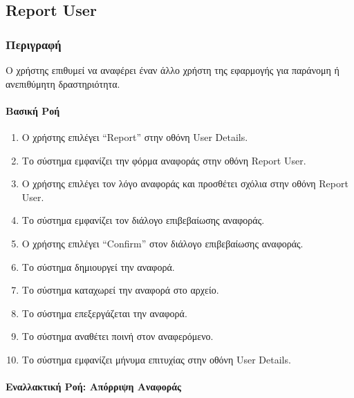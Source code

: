 \hypertarget{report-user}{%
\subsection{Report User}\label{report-user}}

\hypertarget{ux3c0ux3b5ux3c1ux3b9ux3b3ux3c1ux3b1ux3c6ux3ae}{%
\subsubsection{Περιγραφή}\label{ux3c0ux3b5ux3c1ux3b9ux3b3ux3c1ux3b1ux3c6ux3ae}}

Ο χρήστης επιθυμεί να αναφέρει έναν άλλο χρήστη της εφαρμογής για
παράνομη ή ανεπιθύμητη δραστηριότητα.

\hypertarget{ux3b2ux3b1ux3c3ux3b9ux3baux3ae-ux3c1ux3bfux3ae}{%
\paragraph{Βασική
Ροή}\label{ux3b2ux3b1ux3c3ux3b9ux3baux3ae-ux3c1ux3bfux3ae}}

\begin{enumerate}
\def\labelenumi{\arabic{enumi}.}
\tightlist
\item
  Ο χρήστης επιλέγει ``Report'' στην οθόνη User Details.
\item
  Το σύστημα εμφανίζει την φόρμα αναφοράς στην οθόνη Report User.
\item
  Ο χρήστης επιλέγει τον λόγο αναφοράς και προσθέτει σχόλια στην οθόνη
  Report User.
\item
  Το σύστημα εμφανίζει τον διάλογο επιβεβαίωσης αναφοράς.
\item
  Ο χρήστης επιλέγει ``Confirm'' στον διάλογο επιβεβαίωσης αναφοράς.
\item
  Το σύστημα δημιουργεί την αναφορά.
\item
  Το σύστημα καταχωρεί την αναφορά στο αρχείο.
\item
  Το σύστημα επεξεργάζεται την αναφορά.
\item
  Το σύστημα αναθέτει ποινή στον αναφερόμενο.
\item
  Το σύστημα εμφανίζει μήνυμα επιτυχίας στην οθόνη User Details.
\end{enumerate}

\hypertarget{ux3b5ux3bdux3b1ux3bbux3bbux3b1ux3baux3c4ux3b9ux3baux3ae-ux3c1ux3bfux3ae-ux3b1ux3c0ux3ccux3c1ux3c1ux3b9ux3c8ux3b7-ux3b1ux3bdux3b1ux3c6ux3bfux3c1ux3acux3c2}{%
\paragraph{Εναλλακτική Ροή: Απόρριψη
Αναφοράς}\label{ux3b5ux3bdux3b1ux3bbux3bbux3b1ux3baux3c4ux3b9ux3baux3ae-ux3c1ux3bfux3ae-ux3b1ux3c0ux3ccux3c1ux3c1ux3b9ux3c8ux3b7-ux3b1ux3bdux3b1ux3c6ux3bfux3c1ux3acux3c2}}

